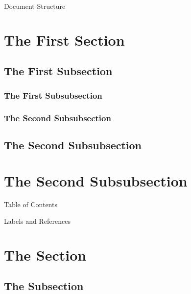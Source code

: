 \documentclass{article}
\begin{document}
    \newpage

    {\Large Document Structure}
    \section[control section display in table of contents]{The First Section}
    \subsection{The First Subsection}
    \subsubsection{The First Subsubsection}
    \subsubsection{The Second Subsubsection}
    \subsection{The Second Subsubsection}
    \section{The Second Subsubsection}

    {\Large Table of Contents}\\
    \tableofcontents


    \vspace{1cm}
    {\Large Labels and References}
    \section{The Section} \label{sec:MySec}
    \subsection{The Subsection}\label{subsec:MySubsec}
\end{document}
